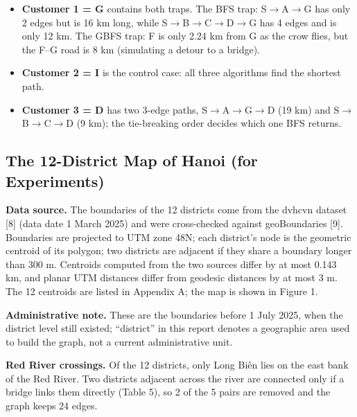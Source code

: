 \documentclass[12pt,a4paper]{article}
\providecommand{\tightlist}{\setlength{\itemsep}{0pt}\setlength{\parskip}{0pt}}
\begin{document}
\begin{itemize}
\tightlist
\item
  \textbf{Customer 1 = G} contains both traps. The BFS trap:
  S\(\rightarrow\)A\(\rightarrow\)G has only 2 edges but is
  16 km long, while
  S\(\rightarrow\)B\(\rightarrow\)C\(\rightarrow\)D\(\rightarrow\)G
  has 4 edges and is only 12 km. The GBFS trap: F is only
  2.24 km from G as the crow flies, but the F--G road is 8
  km (simulating a detour to a bridge).
\item
  \textbf{Customer 2 = I} is the control case: all three
  algorithms find the shortest path.
\item
  \textbf{Customer 3 = D} has two 3-edge paths,
  S\(\rightarrow\)A\(\rightarrow\)G\(\rightarrow\)D (19 km)
  and S\(\rightarrow\)B\(\rightarrow\)C\(\rightarrow\)D (9
  km); the tie-breaking order decides which one BFS returns.
\end{itemize}

\subsection{The 12-District Map of Hanoi (for
Experiments)}

\textbf{Data source.} The boundaries of the 12 districts
come from the dvhcvn dataset {[}8{]} (data date 1 March
2025) and were cross-checked against geoBoundaries {[}9{]}.
Boundaries are projected to UTM zone 48N; each district's
node is the geometric centroid of its polygon; two districts
are adjacent if they share a boundary longer than 300 m.
Centroids computed from the two sources differ by at most
0.143 km, and planar UTM distances differ from geodesic
distances by at most 3 m. The 12 centroids are listed in
Appendix A; the map is shown in Figure 1.

\textbf{Administrative note.} These are the boundaries
before 1 July 2025, when the district level still existed;
``district'' in this report denotes a geographic area used
to build the graph, not a current administrative unit.

\textbf{Red River crossings.} Of the 12 districts, only Long
Biên lies on the east bank of the Red River. Two districts
adjacent across the river are connected only if a bridge
links them directly (Table 5), so 2 of the 5 pairs are
removed and the graph keeps 24 edges.
\end{document}
